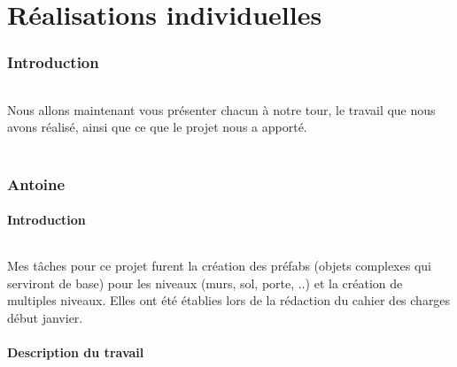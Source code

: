 \documentclass[titlepage, 13px, a4paper]{report}
\begin{document}

\newpage


\part{Réalisations individuelles}
\section*{Introduction}
\paragraph*{} \hspace{0pt}
Nous allons maintenant vous présenter chacun à notre tour, le travail que nous avons réalisé, 
ainsi que ce que le projet nous a apporté. \\ \\

\section{Antoine}
\subsection{Introduction}
\paragraph*{} \hspace{0pt} 
Mes tâches pour ce projet furent la création des préfabs (objets complexes qui
serviront de base) pour les niveaux (murs, sol, porte, ..) et la création de multiples
niveaux. Elles ont été établies lors de la rédaction du cahier des charges début janvier. \\

\subsection{Description du travail}
\end{document}
